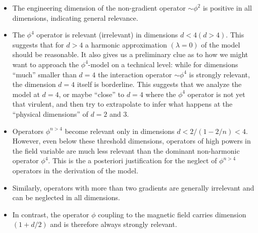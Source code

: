 \begin{itemize}
\item The engineering dimension of the non-gradient operator $\sim \phi^2$ is positive in all dimensions, indicating general relevance.
\item The $\phi^4$ operator is relevant (irrelevant) in dimensions $d < 4 (d > 4)$. This suggests that for $d > 4$ a harmonic approximation $(\lambda = 0)$ of the model should be reasonable. 
It also gives us a preliminary clue as to how we might want to approach the $\phi^4$-model on a technical level: 
while for dimensions ``much'' smaller than $d = 4$ the interaction operator $\sim \phi^4$ is strongly relevant, the dimension $d = 4$ itself is borderline. 
This suggests that we analyze the model at $d = 4$, or maybe ``close''  to $d = 4$ where the $\phi^4$ operator is not yet that virulent, and then try to extrapolate to infer what happens at the ``physical dimensions'' of $d = 2$ and $3$.
\item Operators $\phi^{n > 4}$ become relevant only in dimensions $d < 2/(1-2/n) < 4$. 
However, even below these threshold dimensions, operators of high powers in the field variable are much less relevant than the dominant non-harmonic operator $\phi^4$. This is the a posteriori justification for the neglect of $\phi^{n>4}$ operators in the derivation of the model.
\item Similarly, operators with more than two gradients are generally irrelevant and can be neglected in all dimensions.
\item In contrast, the operator $\phi$ coupling to the magnetic field carries dimension $(1+d/2)$ and is therefore always strongly relevant.
\end{itemize}

